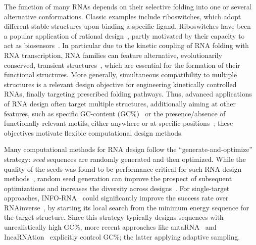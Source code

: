 \documentclass[twocolumn]{bmcart}%
\newcommand{\Def}[1]{\emph{#1}}
\newcommand{\parHead}[1]{\Final{\paragraph{#1}}}
\newcommand{\Final}[1]{\begingroup\color{red!70!black}#1\endgroup}
\renewcommand{\Final}[1]{}
\newcommand{\Nuc}[1]{{\sf #1}}
\newcommand{\Cb}{\Nuc{C}}
\newcommand{\Gb}{\Nuc{G}}
\newcommand{\GCb}{\Gb\Cb}
\newcommand{\Software}[1]{{\ttfamily #1}}
\newcommand{\citep}[1]{\cite{#1}}
\newcommand{\citet}[1]{\cite{#1}}
\begin{document}
\parHead{Motivating multiple RNA design.} The function of many RNAs
depends on their selective folding into one or several alternative
conformations. Classic examples include riboswitches, which
adopt different stable structures upon binding a specific
ligand. Riboswitches have been a popular application of rational
design~\citep{Wachsmuth2013,Domin2017}, partly motivated by their
capacity to act as biosensors~\citep{Findeiss2017}.
In particular due to the kinetic coupling of RNA folding with RNA transcription, RNA families can feature alternative,
evolutionarily conserved, transient structures~\citep{Zhu2013}, which
are essential for the formation of their functional structures.  More generally, simultaneous compatibility to multiple
structures is a relevant design objective for engineering kinetically
controlled RNAs, finally targeting prescribed folding pathways. Thus,
advanced applications of RNA design often target multiple structures,
additionally aiming at other features, such as specific
\GCb-content (\GCb\%)~\citet{Reinharz2013} or the presence/absence of
functionally relevant motifs, either anywhere or at specific
positions~\citep{Zhou2013}; these objectives motivate flexible
computational design methods.

\parHead{On the importance of sampling for design.}
Many computational methods for RNA design follow the ``generate-and-optimize'' strategy: \Def{seed} sequences are randomly generated and then optimized.
While the quality of the seeds was
found to be performance critical for such RNA design
methods~\citep{Levin2012}, random seed generation
can improve the prospect of subsequent optimizations
and increases the diversity
across designs~\citep{Reinharz2013}.  For single-target approaches,
\Software{INFO-RNA}~\citep{Busch2006} could significantly improve the success rate over \Software{RNAinverse}~\citep{Hofacker1994}, by starting its local search from the minimum energy sequence
for the target structure. Since this
strategy typically designs sequences with unrealistically high
\GCb\%,
more recent approaches like \Software{antaRNA}~\citep{Kleinkauf2015} and \Software{IncaRNAtion}~\citep{Reinharz2013} explicitly control \GCb\%; the latter applying adaptive sampling.
\end{document}
